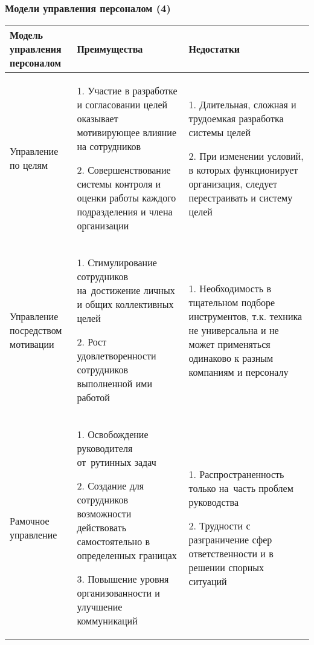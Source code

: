 \documentclass{../industrial-development}
\begin{document}
\begin{frame} \frametitle{Модели управления персоналом (4)}
	\begin{table}[h]
		\begin{center}
			\begin{tabular}{|p{}|p{3,5cm}|p{}|}
				\hline
				\tiny \textbf{Модель управления персоналом}   & \tiny \textbf{Преимущества} & \tiny \textbf{Недостатки} \\
				\hline
				\tiny Управление по целям & 
				\tiny 1. Участие в разработке и согласовании целей оказывает мотивирующее влияние на сотрудников
				
				2. Совершенствование системы контроля и оценки работы каждого подразделения и члена организации
				& 
				\tiny 1. Длительная, сложная и трудоемкая разработка системы целей 
				
				2. При изменении условий, в которых функционирует организация, следует перестраивать и систему целей \\
				\hline
				\tiny Управление посредством мотивации & 
				\tiny 1. Стимулирование сотрудников на~достижение личных и общих коллективных целей
				
				2. Рост удовлетворенности сотрудников выполненной ими работой
				
				&
				\tiny 1. Необходимость в тщательном подборе инструментов, т.к. техника не универсальна и не может применяться одинаково к разным компаниям и персоналу
				
				\\
				\hline
				\tiny Рамочное управление  & 
				
				\tiny
				1. Освобождение руководителя от~рутинных задач
				
				2. Создание для сотрудников возможности действовать самостоятельно в определенных границах
				
				3. Повышение уровня организованности и улучшение коммуникаций
				&
				\tiny 
				1. Распространенность только на~часть проблем руководства
				
				2. Трудности с разграничение сфер ответственности и в решении спорных ситуаций
				\\
				
				\hline
			\end{tabular}
		\end{center}
	\end{table}
\end{frame}

\lecturenotes
\end{document}
